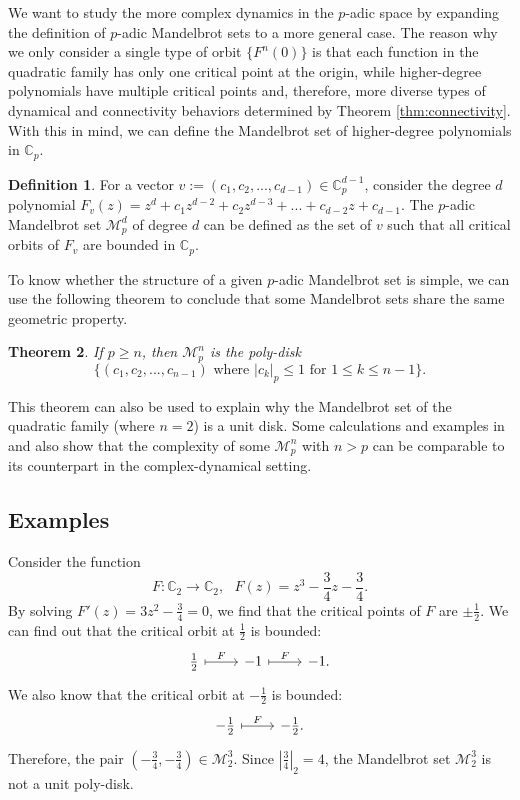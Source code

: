 \documentclass{amsart}
\theoremstyle{plain}
\newtheorem{theorem}{Theorem}[section]
\theoremstyle{definition}
\newtheorem{definition}[theorem]{Definition}
\theoremstyle{remark}
\numberwithin{equation}{section}
\newcommand{\C}{\mathbb{C}}
\newcommand{\calm}{\mathcal{M}}
\begin{document}
We want to study the more complex dynamics in the $p$-adic space by expanding the definition of $p$-adic Mandelbrot sets to a more general case. The reason why we only consider a single type of orbit $\{F^n(0)\}$ is that each function in the quadratic family has only one critical point at the origin, while higher-degree polynomials have multiple critical points and, therefore, more diverse types of dynamical and connectivity behaviors determined by Theorem \ref{thm:connectivity}. With this in mind, we can define the Mandelbrot set of higher-degree polynomials in $\C_p$. 

\begin{definition}
    For a vector $v := (c_1, c_2, ...,c_{d-1})\in\C_p^{d-1}$, consider the degree $d$ polynomial $F_v(z) = z^d + c_1z^{d-2} + c_2z^{d-3} + ...+c_{d-2}z+c_{d-1}$. The $p$-adic Mandelbrot set $\calm_p^d$ of degree $d$ can be defined as the set of $v$ such that all critical orbits of $F_v$ are bounded in $\C_p$.
\end{definition}

To know whether the structure of a given $p$-adic Mandelbrot set is simple, we can use the following theorem to conclude that some Mandelbrot sets share the same geometric property.
\begin{theorem}
        \label{thm:disk} \cite[Theorem 1]{MR3113229} 
    If $p\geq n$, then $\calm_p^n$ is the poly-disk \[\{(c_1, c_2,...,c_{n-1})\text{ where }|c_k|_p\leq1 \text{ for } 1\leq k\leq n-1 \}.\]
\end{theorem}
This theorem can also be used to explain why the Mandelbrot set of the quadratic family (where $n=2$) is a unit disk. Some calculations and examples in \cite[Page 2 and 3]{MR3113229} and \cite[Figure 1, 2, and 3]{MR3040666} also show that the complexity of some $\calm_p^n$ with $n>p$ can be comparable to its counterpart in the complex-dynamical setting.
\subsection{Examples} \cite[Example 2]{MR3113229}
Consider the function \[F:\C_2\rightarrow\C_2,\text{ }F(z) = z^3 - \frac{3}{4}z-\frac{3}{4}.\] By solving $F'(z) = 3z^2 - \frac{3}{4} = 0$, we find that the critical points of $F$ are $\pm\frac{1}{2}$. We can find out that the critical orbit at $\frac{1}{2}$ is bounded:
\[
\begin{tikzcd} \frac{1}{2} \arrow[r, mapsto, "F"] & -1 \arrow[r, mapsto, "F"] & -1. \end{tikzcd}
\]
We also know that the critical orbit at $-\frac{1}{2}$ is bounded:
\[
\begin{tikzcd}
-\frac{1}{2} \arrow[r, mapsto, "F"] & -\frac{1}{2}.
\end{tikzcd}
\]
Therefore, the pair $(-\frac{3}{4},-\frac{3}{4})\in\calm_2^3$. Since $|\frac{3}{4}|_2 = 4$, the Mandelbrot set $\calm_2^3$ is not a unit poly-disk. 
\end{document}
